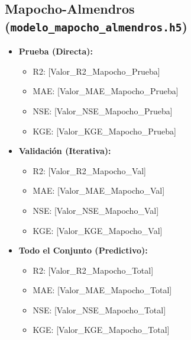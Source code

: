 \documentclass[12pt]{article}
\begin{document}
\subsection*{Mapocho-Almendros (\texttt{modelo\_mapocho\_almendros.h5})}
\begin{itemize}
    \item \textbf{Prueba (Directa):}
    \begin{itemize}
        \item R2: [Valor\_R2\_Mapocho\_Prueba]
        \item MAE: [Valor\_MAE\_Mapocho\_Prueba]
        \item NSE: [Valor\_NSE\_Mapocho\_Prueba]
        \item KGE: [Valor\_KGE\_Mapocho\_Prueba]
    \end{itemize}
    \item \textbf{Validación (Iterativa):}
    \begin{itemize}
        \item R2: [Valor\_R2\_Mapocho\_Val]
        \item MAE: [Valor\_MAE\_Mapocho\_Val]
        \item NSE: [Valor\_NSE\_Mapocho\_Val]
        \item KGE: [Valor\_KGE\_Mapocho\_Val]
    \end{itemize}
    \item \textbf{Todo el Conjunto (Predictivo):}
    \begin{itemize}
        \item R2: [Valor\_R2\_Mapocho\_Total]
        \item MAE: [Valor\_MAE\_Mapocho\_Total]
        \item NSE: [Valor\_NSE\_Mapocho\_Total]
        \item KGE: [Valor\_KGE\_Mapocho\_Total]
    \end{itemize}
\end{itemize}
\end{document}

